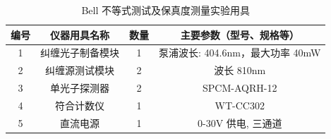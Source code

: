 \begin{table}[h!]
	\centering
	\caption{Bell 不等式测试及保真度测量实验用具}
	\begin{tabular}{cccc}
		\hline
		\textbf{编号} & \textbf{仪器用具名称} & \textbf{数量} & \textbf{主要参数（型号、规格等）} \\ \hline
		1 & 纠缠光子制备模块 & 1 & 泵浦波长: 404.6nm，最大功率 40mW \\ 
		2 & 纠缠源测试模块 & 2 & 波长 810nm \\ 
		3 & 单光子探测器 & 2 & SPCM-AQRH-12 \\ 
		4 & 符合计数仪 & 1 & WT-CC302 \\ 
		5 & 直流电源 & 1 & 0-30V 供电, 三通道 \\ \hline
	\end{tabular}
\end{table}